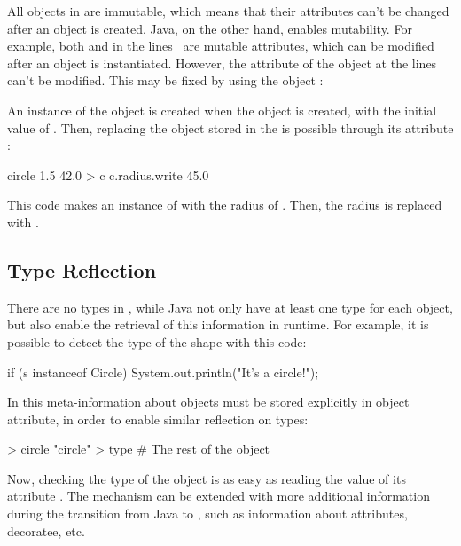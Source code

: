 All objects in \eo{} are immutable, which means that their attributes
can't be changed after an object is created. Java, on the other hand,
enables mutability. For example, both  and  in the
lines~ are mutable attributes,
which can be modified after an object is instantiated. However,
the attribute  of the \eo{} object  at the
lines~ can't be modified. This
may be fixed by using the object :


An instance of the object  is created when the object 
is created, with the initial value of . Then, replacing the
object stored in the  is possible through its attribute :

\begin{ffcode}
circle 1.5 42.0 > c
c.radius.write 45.0
\end{ffcode}

This code makes an instance of  with the radius of .
Then, the radius is replaced with .

\subsection{Type Reflection}

There are no types in \eo{}, while Java not only have at least one type
for each object, but also enable the retrieval of this information in
runtime. For example, it is possible to detect the type of the shape
with this code:

\begin{ffcode}
if (s instanceof Circle) {
  System.out.println("It's a circle!");
}
\end{ffcode}

In \eo{} this meta-information about objects must be stored
explicitly in object attribute, in order to enable similar
reflection on types:

\begin{ffcode}
 > circle
  "circle" > type
  # The rest of the object
\end{ffcode}

Now, checking the type of the object is as easy as reading the
value of its attribute . The mechanism can be extended
with more additional information during the transition from
Java to \eo{}, such as information about attributes, decoratee, etc.

